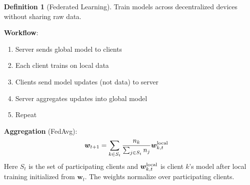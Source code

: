 \documentclass[11pt,twoside]{article}
\numberwithin{equation}{section}
\newcommand{\vect}[1]{\bm{#1}}
\theoremstyle{plain}
\theoremstyle{definition}
\newtheorem{definition}[theorem]{Definition}
\theoremstyle{remark}
\begin{document}
\begin{definition}[Federated Learning]
Train models across decentralized devices without sharing raw data.

\textbf{Workflow}:
\begin{enumerate}
\item Server sends global model to clients
\item Each client trains on local data
\item Clients send model updates (not data) to server
\item Server aggregates updates into global model
\item Repeat
\end{enumerate}

\textbf{Aggregation} (FedAvg):
\[
\vect{w}_{t+1}=\sum_{k\in S_t}\frac{n_k}{\sum_{j\in S_t}n_j}\vect{w}_{k,t}^{\rm local}
\]
Here $S_t$ is the set of participating clients and $\vect{w}_{k,t}^{\rm local}$ is client $k$'s model after local training initialized from $\vect{w}_t$. The weights normalize over participating clients.
\end{definition}
\end{document}
